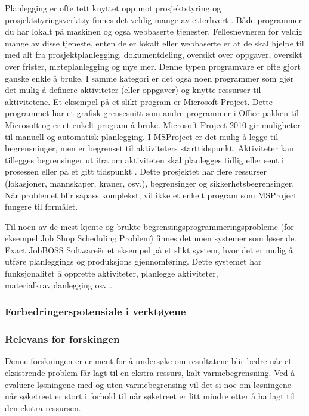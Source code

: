 Planlegging er ofte tett knyttet opp mot prosjektstyring og prosjektstyringsverktøy finnes det veldig mange av etterhvert \cite{projectmanagmenttoolswiki}. Både programmer du har lokalt på maskinen og også webbaserte tjenester. Fellesnevneren for veldig mange av disse tjeneste, enten de er lokalt eller webbaserte er at de skal hjelpe til med alt fra prosjektplanlegging, dokumentdeling, oversikt over oppgaver, oversikt over frister, møteplanlegging og mye mer. Denne typen programvare er ofte gjort ganske enkle å bruke. I samme kategori er det også noen programmer som gjør det mulig å definere aktiviteter (eller oppgaver) og knytte ressurser til aktivitetene. Et eksempel på et slikt program er Microsoft Project. Dette programmet har et grafisk grensesnitt som andre programmer i Office-pakken til Microsoft og er et enkelt program å bruke. Microsoft Project 2010 gir muligheter til manuell og automatisk planlegging\cite{msproject2010blog}. I MSProject er det mulig å legge til begrensninger, men er begrenset til aktiviteters starttidspunkt. Aktiviteter kan tillegges begrensinger ut ifra om aktiviteten skal planlegges tidlig eller sent i prosessen eller på et gitt tidspunkt \cite{begrensingermsproject}. Dette prosjektet har flere ressurser (lokasjoner, mannskaper, kraner, osv.), begrensinger og sikkerhetsbegrensinger. Når problemet blir såpass komplekst, vil ikke et enkelt program som MSProject fungere til formålet.

Til noen av de mest kjente og brukte begrensingsprogrammeringsprobleme (for eksempel \"Job Shop Scheduling Problem\") finnes det noen systemer som løser de. \"Exact JobBOSS Software\" er et eksempel på et slikt system, hvor det er mulig å utføre planleggings og produksjons gjennomføring. Dette systemet har funksjonalitet å opprette aktiviteter, planlegge aktiviteter, materialkravplanlegging osv \cite{exact}.

\subsubsection{Forbedringerspotensiale i verktøyene}

\subsubsection{Relevans for forskingen}
Denne forskningen er er ment for å undersøke om resultatene blir bedre når et eksistrende problem får lagt til en ekstra ressurs, kalt varmebegrensning. Ved å evaluere løsningene med og uten varmebegrensing vil det si noe om løsningene når søketreet er stort i forhold til når søketreet er litt mindre etter å ha lagt til den ekstra ressursen.